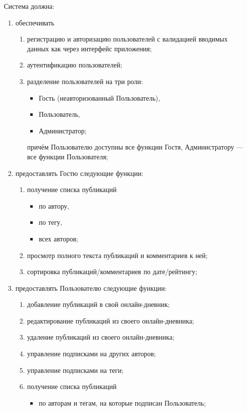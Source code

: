 \documentclass{bmstu-gost-7-32}
\begin{document}
Система должна:
\begin{enumerate}
	\item обеспечивать
	\begin{enumerate}
		\item регистрацию и авторизацию пользователей с валидацией вводимых данных как через интерфейс приложения;
		\item аутентификацию пользователей;
		\item разделение пользователей на три роли:
		\begin{itemize}
			\item Гость (неавторизованный Пользователь),
			\item Пользователь,
			\item Администратор;
		\end{itemize}
		причём Пользователю доступны все функции Гостя, Администратору — все функции Пользователя;
	\end{enumerate}
	\item предоставлять Гостю следующие функции:
	\begin{enumerate}
		\item получение списка публикаций
		\begin{itemize}
			\item по автору,
			\item по тегу,
			\item всех авторов;
		\end{itemize}
		\item просмотр полного текста публикаций и комментариев к ней;
		\item сортировка публикаций/комментариев по дате/рейтингу;
	\end{enumerate}
	\item предоставлять Пользователю следующие функции:
	\begin{enumerate}
		\item добавление публикаций в свой онлайн-дневник;
		\item редактирование публикаций из своего онлайн-дневника;
		\item удаление публикаций из своего онлайн-дневника;
		\item управление подписками на других авторов;
		\item управление подписками на теги;
		\item получение списка публикаций
		\begin{itemize}
			\item по авторам и тегам, на которые подписан Пользователь;

\end{itemize}
\end{enumerate}
\end{enumerate}
\end{document}
